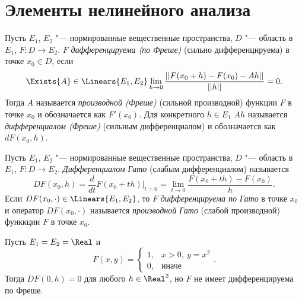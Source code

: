\documentclass[main]{subfiles}
\begin{document}
\section{Элементы нелинейного анализа}%


\begin{definition}
  Пусть \( E_1 \), \( E_2 \) "--- нормированные вещественные пространства,
  \( D \) "--- область в \( E_1 \), \( F: D \to E_2 \).
  \( F \) \emph{дифференцируема (по Фреше)}
  (сильно дифференцируема)
  в точке \( x_0 \in D \),
  если
  \[
    \Exists{A} \in \Linears{E_1, E_2}
    \lim_{h \to 0} \frac{||F(x_0 + h) - F(x_0) - Ah||}{||h||} = 0.
  \]
  Тогда \( A \) называется \emph{производной (Фреше)}
  (сильной производной)
  функции \( F \) в точке \( x_0 \) и обозначается как \( F'(x_0) \).
  Для конкретного \( h \in E_1 \)
  \( Ah \) называется \emph{дифференциалом (Фреше)}
  (сильным дифференциалом)
  и обозначается как \( dF(x_0, h) \).
\end{definition}

\begin{definition}
  Пусть \( E_1 \), \( E_2 \) "--- нормированные вещественные пространства,
  \( D \) "--- область в \( E_1 \), \( F: D \to E_2 \).
  \emph{Дифференциалом Гато} (слабым дифференциалом)
  называется
  \[
    DF(x_0, h) = \frac{d}{dt} F(x_0 + t h) \bigr|_{t=0} =
    \lim_{t \to 0} \frac{F(x_0 + th) - F(x_0)}{h}.
  \]
  Если \( DF(x_0, \cdot) \in \Linears{E_1, E_2} \),
  то \( F \) \emph{дифференцируема по Гато} в точке \( x_0 \)
  и оператор \( DF(x_0, \cdot) \) называется
  \emph{производной Гато} (слабой производной)
  функкции \( F \) в точке \( x_0 \).
\end{definition}

\begin{example}
  Пусть \( E_1 = E_2 = \Real \)
  и
  \[
    F(x, y) = \begin{cases}
      1, & x > 0, \: y = x^2 \\
      0, & \text{иначе}
    \end{cases}.
  \]
  Тогда \( DF(0, h) = 0 \) для любого \( h \in \Real^2 \),
  но \( F \) не имеет дифференцируема по Фреше.
\end{example}
\end{document}
